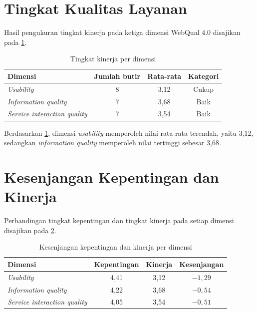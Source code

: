 \section{Tingkat Kualitas Layanan}
\label{sec:hasil-rq1}

Hasil pengukuran tingkat kinerja pada ketiga dimensi WebQual 4.0 disajikan pada
\cref{tab:dimensi}.

\begin{table}[H]
    \centering
    \caption{Tingkat kinerja per dimensi}
    \label{tab:dimensi}
    \begin{tabular}{|l|c|c|c|}
        \hline
        \textbf{Dimensi} & \textbf{Jumlah butir} & \textbf{Rata-rata} & \textbf{Kategori} \\ \hline
        \textit{Usability}                  & 8 & 3,12 & Cukup \\ \hline
        \textit{Information quality}        & 7 & 3,68 & Baik  \\ \hline
        \textit{Service interaction quality}& 7 & 3,54 & Baik  \\ \hline
    \end{tabular}
\end{table}

Berdasarkan \cref{tab:dimensi}, dimensi \textit{usability} memperoleh nilai
rata-rata terendah, yaitu 3,12, sedangkan \textit{information quality}
memperoleh nilai tertinggi sebesar 3,68.

\section{Kesenjangan Kepentingan dan Kinerja}
\label{sec:hasil-rq2}

Perbandingan tingkat kepentingan dan tingkat kinerja pada setiap dimensi
disajikan pada \cref{tab:gap}.

\begin{table}[H]
    \centering
    \caption{Kesenjangan kepentingan dan kinerja per dimensi}
    \label{tab:gap}
    \begin{tabular}{|l|c|c|c|}
        \hline
        \textbf{Dimensi} & \textbf{Kepentingan} & \textbf{Kinerja} & \textbf{Kesenjangan} \\ \hline
        \textit{Usability}                  & 4,41 & 3,12 & $-1{,}29$ \\ \hline
        \textit{Information quality}        & 4,22 & 3,68 & $-0{,}54$ \\ \hline
        \textit{Service interaction quality}& 4,05 & 3,54 & $-0{,}51$ \\ \hline
    \end{tabular}
\end{table}


